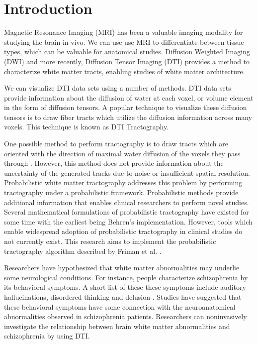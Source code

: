 \chapter{Introduction}

Magnetic Resonance Imaging (MRI) has been a valuable imaging modality for studying the brain in-vivo.  We can use use MRI to differentiate between tissue types, which can be valuable for anatomical studies.  Diffusion Weighted Imaging (DWI) and more recently, Diffusion Tensor Imaging (DTI) provides a method to characterize white matter tracts, enabling studies of white matter architecture.

We can visualize  DTI data sets using a number of methods.  DTI data sets provide information about the diffusion of water at each voxel, or volume element in the form of diffusion tensors.  A popular technique to visualize these diffusion tensors is to draw fiber tracts which utilize the diffusion information across many voxels.  This technique is known as DTI Tractography.

One possible method to perform tractography is to draw tracts which are oriented with the direction of maximal water diffusion of the voxels they pass through \cite{frimanTMI06}.  However, this method does not provide information about the uncertainty of the generated tracks due to noise or insufficient spatial resolution.  Probabilistic white matter tractography addresses this problem by performing tractography under a probabilistic framework.  Probabilistic methods provide additional information that enables clinical researchers to perform novel studies.  Several mathematical formulations of probabilistic tractography have existed for some time with the earliest being Behren's implementation\cite{behrensMRM03}.  However, tools which enable widespread adoption of probabilistic tractography in clinical studies do not currently exist.  This research aims to implement the probabilistic tractography algorithm described by Friman et al. \cite{frimanTMI06}.

Researchers have hypothesized that white matter abnormalities may underlie some neurological conditions.  For instance, people characterize schizophrenia by its behavioral symptoms.  A short list of these these symptoms include auditory hallucinations, disordered thinking and delusion \cite{kubickiNYAS05}.  Studies have suggested that these behavioral symptoms have some connection with the neuroanatomical abnormalities observed in schizophrenia patients\cite{kubickiNYAS05}.  Researchers can noninvasively investigate the relationship between brain white matter abnormalities and schizophrenia by using DTI.

